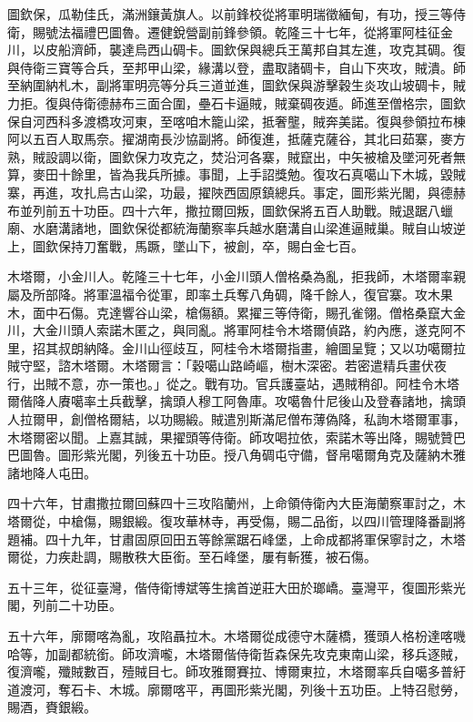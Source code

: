 \begin{pinyinscope}
圖欽保，瓜勒佳氏，滿洲鑲黃旗人。以前鋒校從將軍明瑞徵緬甸，有功，授三等侍衛，賜號法福禮巴圖魯。遷健銳營副前鋒參領。乾隆三十七年，從將軍阿桂征金川，以皮船濟師，襲達烏西山碉卡。圖欽保與總兵王萬邦自其左進，攻克其碉。復與侍衛三寶等合兵，至邦甲山梁，緣溝以登，盡取諸碉卡，自山下夾攻，賊潰。師至納圍納札木，副將軍明亮等分兵三道並進，圖欽保與游擊穀生炎攻山坡碉卡，賊力拒。復與侍衛德赫布三面合圍，壘石卡逼賊，賊棄碉夜遁。師進至僧格宗，圖欽保自河西科多渡橋攻河東，至喀咱木籠山梁，抵奢壟，賊奔美諾。復與參領拉布棟阿以五百人取馬奈。擢湖南長沙協副將。師復進，抵薩克薩谷，其北曰茹寨，麥方熟，賊設調以衛，圖欽保力攻克之，焚沿河各寨，賊竄出，中矢被槍及墜河死者無算，麥田十餘里，皆為我兵所據。事聞，上手詔獎勉。復攻石真噶山下木城，毀賊寨，再進，攻扎烏古山梁，功最，擢陜西固原鎮總兵。事定，圖形紫光閣，與德赫布並列前五十功臣。四十六年，撒拉爾回叛，圖欽保將五百人助戰。賊退踞八蠟廟、水磨溝諸地，圖欽保從都統海蘭察率兵越水磨溝自山梁進逼賊巢。賊自山坡逆上，圖欽保持刀奮戰，馬蹶，墜山下，被創，卒，賜白金七百。

木塔爾，小金川人。乾隆三十七年，小金川頭人僧格桑為亂，拒我師，木塔爾率親屬及所部降。將軍溫福令從軍，即率土兵奪八角碉，降千餘人，復官寨。攻木果木，面中石傷。克達響谷山梁，槍傷額。累擢三等侍衛，賜孔雀翎。僧格桑竄大金川，大金川頭人索諾木匿之，與同亂。將軍阿桂令木塔爾偵路，約內應，遂克阿不里，招其叔朗納降。金川山徑歧互，阿桂令木塔爾指畫，繪圖呈覽；又以功噶爾拉賊守堅，諮木塔爾。木塔爾言：「穀噶山路崎嶇，樹木深密。若密遣精兵畫伏夜行，出賊不意，亦一策也。」從之。戰有功。官兵護臺站，遇賊稍卻。阿桂令木塔爾偕降人賡噶率土兵截擊，擒頭人穆工阿魯庫。攻噶魯什尼後山及登春諸地，擒頭人拉爾甲，創僧格爾結，以功賜緞。賊遣別斯滿尼僧布薄偽降，私詢木塔爾軍事，木塔爾密以聞。上嘉其誠，果擢頭等侍衛。師攻喝拉依，索諾木等出降，賜號贊巴巴圖魯。圖形紫光閣，列後五十功臣。授八角碉屯守備，督帛噶爾角克及薩納木雅諸地降人屯田。

四十六年，甘肅撒拉爾回蘇四十三攻陷蘭州，上命領侍衛內大臣海蘭察軍討之，木塔爾從，中槍傷，賜銀緞。復攻華林寺，再受傷，賜二品銜，以四川管理降番副將題補。四十九年，甘肅固原回田五等餘黨踞石峰堡，上命成都將軍保寧討之，木塔爾從，力疾赴調，賜散秩大臣銜。至石峰堡，屢有斬獲，被石傷。

五十三年，從征臺灣，偕侍衛博斌等生擒首逆莊大田於瑯嶠。臺灣平，復圖形紫光閣，列前二十功臣。

五十六年，廓爾喀為亂，攻陷聶拉木。木塔爾從成德守木薩橋，獲頭人格枌達喀嘰哈等，加副都統銜。師攻濟嚨，木塔爾偕侍衛哲森保先攻克東南山梁，移兵逐賊，復濟嚨，殲賊數百，殪賊目七。師攻雅爾賽拉、博爾東拉，木塔爾率兵自噶多普紆道渡河，奪石卡、木城。廓爾喀平，再圖形紫光閣，列後十五功臣。上特召慰勞，賜酒，賚銀緞。


\end{pinyinscope}
